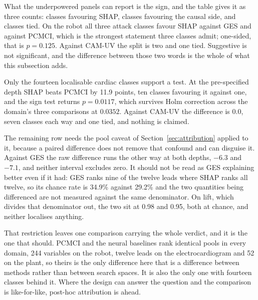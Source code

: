 What the underpowered panels can report is the sign, and the table gives it as three counts: classes favouring SHAP, classes favouring the causal side, and classes tied. On the robot all three attack classes favour SHAP against GES and against PCMCI, which is the strongest statement three classes admit; one-sided, that is $p = 0.125$. Against CAM-UV the split is two and one tied. Suggestive is not significant, and the difference between those two words is the whole of what this subsection adds.

Only the fourteen localisable cardiac classes support a test. At the pre-specified depth SHAP beats PCMCI by 11.9 points, ten classes favouring it against one, and the sign test returns $p = 0.0117$, which survives Holm correction across the domain's three comparisons at $0.0352$. Against CAM-UV the difference is 0.0, seven classes each way and one tied, and nothing is claimed.

The remaining row needs the pool caveat of Section~\ref{sec:attribution} applied to it, because a paired difference does not remove that confound and can disguise it. Against GES the raw difference runs the other way at both depths, $-6.3$ and $-7.1$, and neither interval excludes zero. It should not be read as GES explaining better even if it had: GES ranks nine of the twelve leads where SHAP ranks all twelve, so its chance rate is 34.9\% against 29.2\% and the two quantities being differenced are not measured against the same denominator. On lift, which divides that denominator out, the two sit at 0.98 and 0.95, both at chance, and neither localises anything.

That restriction leaves one comparison carrying the whole verdict, and it is the one that should. PCMCI and the neural baselines rank identical pools in every domain, 244 variables on the robot, twelve leads on the electrocardiogram and 52 on the plant, so theirs is the only difference here that is a difference between methods rather than between search spaces. It is also the only one with fourteen classes behind it. Where the design can answer the question and the comparison is like-for-like, post-hoc attribution is ahead.

